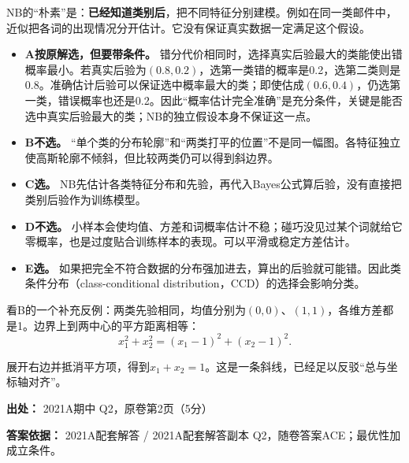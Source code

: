 NB的“朴素”是：\textbf{已经知道类别后}，把不同特征分别建模。例如在同一类邮件中，近似把各词的出现情况分开估计。它没有保证真实数据一定满足这个假设。



\begin{itemize}

\item \textbf{A按原解选，但要带条件。} 错分代价相同时，选择真实后验最大的类能使出错概率最小。若真实后验为\((0.8,0.2)\)，选第一类错的概率是0.2，选第二类则是0.8。准确估计后验可以保证选中概率最大的类；即使估成\((0.6,0.4)\)，仍选第一类，错误概率也还是0.2。因此“概率估计完全准确”是充分条件，关键是能否选中真实后验最大的类；NB的独立假设本身不保证这一点。

\item \textbf{B不选。} “单个类的分布轮廓”和“两类打平的位置”不是同一幅图。各特征独立使高斯轮廓不倾斜，但比较两类仍可以得到斜边界。

\item \textbf{C选。} NB先估计各类特征分布和先验，再代入Bayes公式算后验，没有直接把类别后验作为训练模型。

\item \textbf{D不选。} 小样本会使均值、方差和词概率估计不稳；碰巧没见过某个词就给它零概率，也是过度贴合训练样本的表现。可以平滑或稳定方差估计。

\item \textbf{E选。} 如果把完全不符合数据的分布强加进去，算出的后验就可能错。因此类条件分布（class-conditional distribution，CCD）的选择会影响分类。

\end{itemize}


看B的一个补充反例：两类先验相同，均值分别为\((0,0)\)、\((1,1)\)，各维方差都是1。边界上到两中心的平方距离相等：
\[
x_1^2+x_2^2=(x_1-1)^2+(x_2-1)^2.
\]


展开右边并抵消平方项，得到\(x_1+x_2=1\)。这是一条斜线，已经足以反驳“总与坐标轴对齐”。


\textbf{出处：} 2021A期中 Q2，原卷第2页（5分）


\textbf{答案依据：} 2021A配套解答 / 2021A配套解答副本 Q2，随卷答案ACE；最优性加成立条件。
